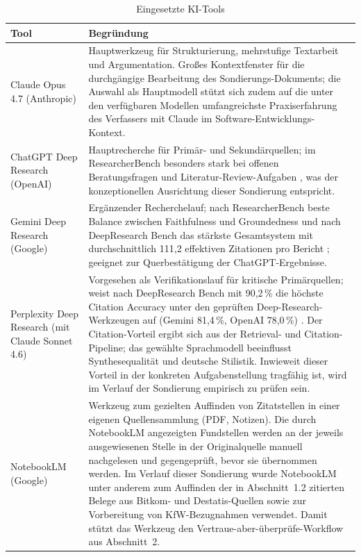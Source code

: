 \documentclass[a4paper,11pt]{article}
\begin{document}
\begin{table}[H]
\centering
\caption{Eingesetzte KI-Tools}
\label{tab:tools_ki}
\begin{tabular}{p{4.5cm}p{10.5cm}}
\toprule
\textbf{Tool} & \textbf{Begründung} \\
\midrule
Claude Opus 4.7 (Anthropic) & Hauptwerkzeug für Strukturierung, mehrstufige Textarbeit und Argumentation. Großes Kontextfenster für die durchgängige Bearbeitung des Sondierungs-Dokuments; die Auswahl als Hauptmodell stützt sich zudem auf die unter den verfügbaren Modellen umfangreichste Praxiserfahrung des Verfassers mit Claude im Software-Entwicklungs-Kontext. \\
ChatGPT Deep Research (OpenAI) & Hauptrecherche für Primär- und Sekundärquellen; im ResearcherBench besonders stark bei offenen Beratungsfragen und Literatur-Review-Aufgaben \parencite{Xu2025ResearcherBench}, was der konzeptionellen Ausrichtung dieser Sondierung entspricht. \\
Gemini Deep Research (Google) & Ergänzender Recherchelauf; nach ResearcherBench beste Balance zwischen Faithfulness und Groundedness \parencite{Xu2025ResearcherBench} und nach DeepResearch Bench das stärkste Gesamtsystem mit durchschnittlich 111,2 effektiven Zitationen pro Bericht \parencite{Du2025DeepResearchBench}; geeignet zur Querbestätigung der ChatGPT-Ergebnisse. \\
Perplexity Deep Research (mit Claude Sonnet 4.6) & Vorgesehen als Verifikationslauf für kritische Primärquellen; weist nach DeepResearch Bench mit 90{,}2\,\% die höchste Citation Accuracy unter den geprüften Deep-Research-Werkzeugen auf (Gemini 81{,}4\,\%, OpenAI 78{,}0\,\%) \parencite{Du2025DeepResearchBench}. Der Citation-Vorteil ergibt sich aus der Retrieval- und Citation-Pipeline; das gewählte Sprachmodell beeinflusst Synthesequalität und deutsche Stilistik. Inwieweit dieser Vorteil in der konkreten Aufgabenstellung tragfähig ist, wird im Verlauf der Sondierung empirisch zu prüfen sein. \\
NotebookLM (Google) & Werkzeug zum gezielten Auffinden von Zitatstellen in einer eigenen Quellensammlung (PDF, Notizen). Die durch NotebookLM angezeigten Fundstellen werden an der jeweils ausgewiesenen Stelle in der Originalquelle manuell nachgelesen und gegengeprüft, bevor sie übernommen werden. Im Verlauf dieser Sondierung wurde NotebookLM unter anderem zum Auffinden der in Abschnitt~1.2 zitierten Belege aus Bitkom- und Destatis-Quellen sowie zur Vorbereitung von KfW-Bezugnahmen verwendet. Damit stützt das Werkzeug den Vertraue-aber-überprüfe-Workflow aus Abschnitt~2. \\
\bottomrule
\end{tabular}
\end{table}

\newpage

\printbibliography
{}
\end{document}
